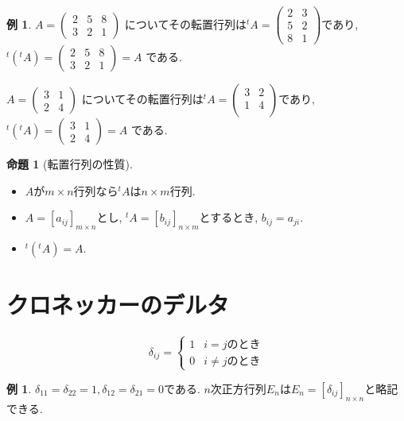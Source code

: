 \documentclass[dvipdfmx,a4paper,11pt]{article}
\theoremstyle{definition}
\newtheorem{prop}[thm]{命題}
\newtheorem{exa}[thm]{例}
\begin{document}
\begin{exa}
 $
 A = 
 \begin{pmatrix}
 2 &5&8 \\
 3&2&1
 \end{pmatrix}
 \text{ についてその転置行列は}
{}^{t}A = 
 \begin{pmatrix}
 2 &3 \\
 5&2\\
 8&1
 \end{pmatrix}
  \text{であり, }
 $
 $
{}^{t}({}^{t}A) = 
 \begin{pmatrix}
 2 &5&8 \\
 3&2&1
 \end{pmatrix}
 =A
 $
 である.
 
  $
 A = 
 \begin{pmatrix}
 3 &1 \\
 2&4
 \end{pmatrix}
 \text{ についてその転置行列は}
{}^{t}A = 
 \begin{pmatrix}
 3 &2 \\
 1&4\\
 \end{pmatrix}
  \text{であり, }
 $
  $
{}^{t}({}^{t}A) = 
 \begin{pmatrix}
 3 &1 \\
 2&4
 \end{pmatrix}
 =A
 $
 である.
\end{exa}

 \begin{tcolorbox}[
    colback = white,
    colframe = green!35!black,
    fonttitle = \bfseries,
    breakable = true]
    \begin{prop}[転置行列の性質]
    \text{}
\begin{itemize}
\item $A$が$m\times n$行列なら${}^{t}A $は$n\times m$行列.
\item $A=[a_{ij}]_{m \times n}$とし, ${}^{t}A=[b_{ij}]_{n \times m}$とするとき, $b_{ij} =a_{ji}$.
\item ${}^{t}({}^{t}A) =A$.
\end{itemize}

  \end{prop}
 \end{tcolorbox}
 
 \section{クロネッカーのデルタ}
 $$
 \delta_{ij} = 
 \begin{cases}
1 & \text{$i=j$のとき}\\
0 & \text{$i \neq j$のとき}
\end{cases}
  $$
 \begin{exa}
 $\delta_{11}=\delta_{22}=1, \delta_{12}=\delta_{21}=0$である. $n$次正方行列$E_n$は$E_n = [\delta_{ij}]_{n\times n}$と略記できる.
 \end{exa}
\end{document}
